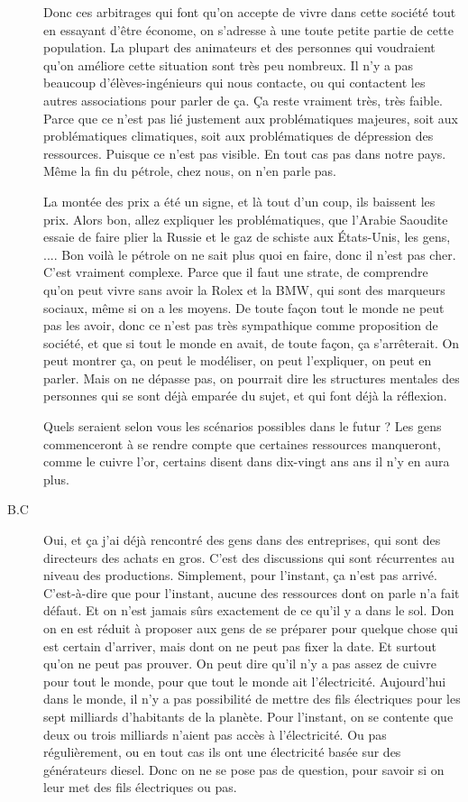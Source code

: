 \begin{description}
Donc ces arbitrages qui font qu'on accepte de vivre dans cette société tout en essayant d'être économe, on s'adresse à une toute petite partie de cette population. La plupart des animateurs et des personnes qui voudraient qu'on améliore cette situation sont très peu nombreux. Il n'y a pas beaucoup d'élèves-ingénieurs qui nous contacte, ou qui contactent les autres associations pour parler de ça. Ça reste vraiment très, très faible. Parce que ce n'est pas lié justement aux problématiques majeures, soit aux problématiques climatiques, soit aux problématiques de dépression des ressources. Puisque ce n'est pas visible. En tout cas pas dans notre pays. Même la fin du pétrole, chez nous, on n'en parle pas.

La montée des prix a été un signe, et là tout d'un coup, ils baissent les prix. Alors bon, allez expliquer les problématiques, que l'Arabie Saoudite essaie de faire plier la Russie et le gaz de schiste aux États-Unis, les gens, .... Bon voilà le pétrole on ne sait plus quoi en faire, donc il n'est pas cher. C'est vraiment complexe. Parce que il faut une strate, de comprendre qu'on peut vivre sans  avoir la Rolex et la BMW, qui sont des marqueurs sociaux, même si on a les moyens. De toute façon tout le monde ne peut pas les avoir, donc ce n'est pas très sympathique comme proposition de société, et que si tout le monde en avait, de toute façon, ça s'arrêterait. On peut montrer ça, on peut le modéliser, on peut l'expliquer, on peut en parler. Mais on ne dépasse pas, on pourrait dire les structures mentales des personnes qui se sont déjà emparée du sujet, et qui font déjà la réflexion.

\vspace{1\baselineskip}

Quels seraient selon vous les scénarios possibles dans le futur ? Les gens commenceront à se rendre compte que certaines ressources manqueront, comme le cuivre l'or, certains disent dans dix-vingt ans ans il n'y en aura plus.

\vspace{1\baselineskip}

\item[B.C]Oui, et ça j'ai déjà rencontré des gens dans des entreprises, qui sont des directeurs des achats en gros. C'est des discussions qui sont récurrentes au niveau des productions. Simplement, pour l'instant, ça n'est pas arrivé. C'est-à-dire que pour l'instant, aucune des ressources dont on parle n'a fait défaut. Et on n'est jamais sûrs exactement de ce qu'il y a dans le sol. Don on en est réduit à proposer aux gens de se préparer pour quelque chose qui est certain d'arriver, mais dont on ne peut pas fixer la date. Et surtout qu'on ne peut pas prouver. On peut dire qu'il n'y a pas assez de cuivre pour tout le monde, pour que tout le monde ait l'électricité. Aujourd'hui dans le monde, il n'y a pas possibilité de mettre des fils électriques pour les sept milliards d’habitants de la planète. Pour l'instant, on se contente que deux ou trois milliards n'aient pas accès à l'électricité. Ou pas régulièrement, ou en tout cas ils ont une électricité basée sur des générateurs diesel. Donc on ne se pose pas de question, pour savoir si on leur met des fils électriques ou pas. 


\end{description}
